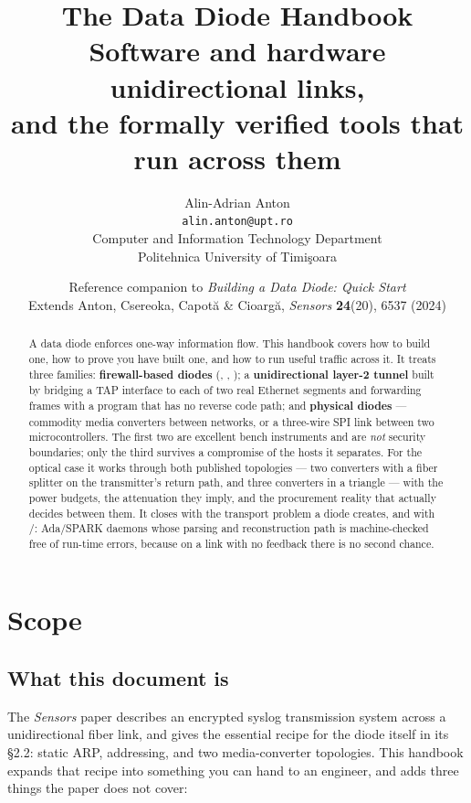 \documentclass[11pt,a4paper]{article}
\title{\vspace{-12mm}\textbf{The Data Diode Handbook}\\[2mm]
       \large Software and hardware unidirectional links,\\
       \large and the formally verified tools that run across them}
\author{Alin-Adrian Anton \\
        \small \texttt{alin.anton@upt.ro} \\
        \small Computer and Information Technology Department\\
        \small Politehnica University of Timi\c{s}oara}
\date{\small Reference companion to \emph{Building a Data Diode: Quick Start}\\
      \small Extends Anton, Csereoka, Capot\u{a} \& Cioarg\u{a},
      \emph{Sensors} \textbf{24}(20), 6537 (2024)}
\renewcommand{\amp}{\prog{ld\_amp}}
\renewcommand{\deamp}{\prog{ld\_deamp}}
\begin{document}
\maketitle
\thispagestyle{fancy}

\begin{abstract}
\noindent
A data diode enforces one-way information flow. This handbook covers how to
build one, how to prove you have built one, and how to run useful traffic
across it. It treats three families: \textbf{firewall-based diodes}
(, , ); a \textbf{unidirectional
layer-2 tunnel} built by bridging a TAP interface to each of two real
Ethernet segments and forwarding frames with a program that has no reverse
code path; and \textbf{physical diodes} --- commodity media converters between
networks, or a three-wire SPI link between two microcontrollers. The first two
are excellent bench instruments and are \emph{not} security boundaries; only
the third survives a compromise of the hosts it separates. For the optical
case it works through both published topologies --- two converters with a
fiber splitter on the transmitter's return path, and three converters in a
triangle --- with the power budgets, the attenuation they imply, and the
procurement reality that actually decides between them. It closes with the
transport problem a diode creates, and with \amp{}/\deamp{}: Ada/SPARK
daemons whose parsing and reconstruction path is machine-checked free of
run-time errors, because on a link with no feedback there is no second
chance.
\end{abstract}

\vspace{2mm}
{\small\tableofcontents}
\clearpage

\section{Scope}

\subsection{What this document is}

The \emph{Sensors} paper \cite{anton2024} describes an encrypted syslog
transmission system across a unidirectional fiber link, and gives the
essential recipe for the diode itself in its \S2.2: static ARP, addressing,
and two media-converter topologies. This handbook expands that recipe into
something you can hand to an engineer, and adds three things the paper does
not cover:
\end{document}
